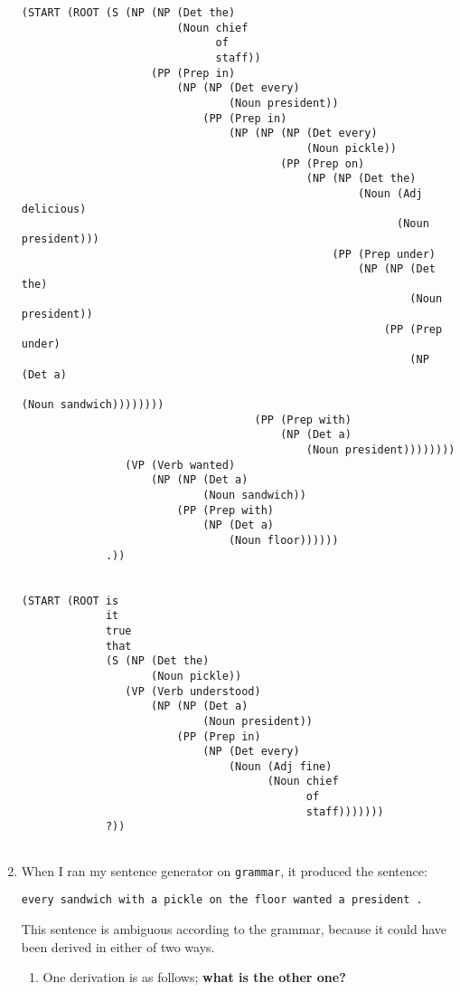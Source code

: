 \documentclass[10pt]{article}
\begin{document}
\begin{enumerate}
{\begin{verbatim}
(START (ROOT (S (NP (NP (Det the)
                        (Noun chief
                              of
                              staff))
                    (PP (Prep in)
                        (NP (NP (Det every)
                                (Noun president))
                            (PP (Prep in)
                                (NP (NP (NP (Det every)
                                            (Noun pickle))
                                        (PP (Prep on)
                                            (NP (NP (Det the)
                                                    (Noun (Adj delicious)
                                                          (Noun president)))
                                                (PP (Prep under)
                                                    (NP (NP (Det the)
                                                            (Noun president))
                                                        (PP (Prep under)
                                                            (NP (Det a)
                                                                (Noun sandwich))))))))
                                    (PP (Prep with)
                                        (NP (Det a)
                                            (Noun president))))))))
                (VP (Verb wanted)
                    (NP (NP (Det a)
                            (Noun sandwich))
                        (PP (Prep with)
                            (NP (Det a)
                                (Noun floor))))))
             .))


(START (ROOT is
             it
             true
             that
             (S (NP (Det the)
                    (Noun pickle))
                (VP (Verb understood)
                    (NP (NP (Det a)
                            (Noun president))
                        (PP (Prep in)
                            (NP (Det every)
                                (Noun (Adj fine)
                                      (Noun chief
                                            of
                                            staff)))))))
             ?))


\end{verbatim}
}

\item When I ran my sentence generator on \verb|grammar|, it produced
  the sentence:
\begin{verbatim}
every sandwich with a pickle on the floor wanted a president .
\end{verbatim}
\noindent
This sentence is ambiguous according to the grammar, because it could
have been derived in either of two ways.
\begin{enumerate}
\item  One derivation is as follows; {\bf what is the other one?}


\end{enumerate}
\end{enumerate}
\end{document}

